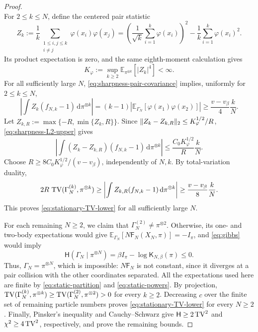 \documentclass[11pt,reqno]{amsart}
\numberwithin{equation}{section}
\theoremstyle{plain}
\theoremstyle{remark}
\DeclarePairedDelimiter{\norm}{\lVert}{\rVert}
\newcommand{\E}{\mathbb E}\newcommand{\Q}{\mathbb Q}\newcommand{\Pb}{\mathbb P}
\newcommand{\K}{\mathsf K}\newcommand{\g}{\mathsf g}\newcommand{\Fr}{\mathsf F}
\newcommand{\Hr}{\mathsf H}\newcommand{\dd}{\,\mathrm d}
\begin{document}
\begin{proof}
\begin{equation}
\end{equation}
For $2\le k\le N$, define the centered pair statistic
\begin{equation}\label{eq:sharpness-pair-statistic}
 Z_k:=\frac1k\sum_{\substack{1\le i,j\le k\\i\ne j}}\varphi(x_i)\varphi(x_j)
 =\left(\frac1{\sqrt k}\sum_{i=1}^k\varphi(x_i)\right)^2-\frac1k\sum_{i=1}^k\varphi(x_i)^2.
\end{equation}
Its product expectation is zero, and the same eighth-moment calculation gives
\begin{equation}\label{eq:sharpness-pair-fourth-moment}
 K_\varphi:=\sup_{k\ge2}\E_{\pi^{\otimes k}}[|Z_k|^4]<\infty.
\end{equation}
For all sufficiently large $N$, \eqref{eq:sharpness-pair-covariance} implies, uniformly for $2\le k\le N$,
\begin{equation}\label{eq:sharpness-pair-response}
 \left|\int Z_k(f_{N,k}-1)\dd\pi^{\otimes k}\right|
 =(k-1)\left|\E_{\Gamma_N}[\varphi(x_1)\varphi(x_2)]\right|
 \ge\frac{v-v_\beta}{4}\frac{k}{N}.
\end{equation}
Let $Z_{k,R}:=\max\{-R,\min\{Z_k,R\}\}$. Since $\norm{Z_k-Z_{k,R}}_2\le K_\varphi^{1/2}/R$, \eqref{eq:sharpness-L2-upper} gives
\begin{equation}\label{eq:sharpness-clipping-error}
 \left|\int(Z_k-Z_{k,R})(f_{N,k}-1)\dd\pi^{\otimes k}\right|
 \le\frac{C_0K_\varphi^{1/2}}{R}\frac{k}{N}.
\end{equation}
Choose $R\ge8C_0K_\varphi^{1/2}/(v-v_\beta)$, independently of $N,k$. By total-variation duality,
\begin{equation}\label{eq:sharpness-TV-duality}
 2R\,\TV(\Gamma_N^{(k)},\pi^{\otimes k})
 \ge\left|\int Z_{k,R}(f_{N,k}-1)\dd\pi^{\otimes k}\right|
 \ge\frac{v-v_\beta}{8}\frac{k}{N}.
\end{equation}
This proves \eqref{eq:stationary-TV-lower} for all sufficiently large $N$.

For each remaining $N\ge2$, we claim that $\Gamma_N^{(2)}\ne\pi^{\otimes2}$. Otherwise, its one- and two-body expectations would give $\E_{\Gamma_N}[N\Fr_N(X_N,\pi)]=-I_\pi$, and \eqref{eq:gibbs} would imply
\begin{equation}\label{eq:sharpness-finite-N-entropy}
 \Hr(\Gamma_N\mid\pi^{\otimes N})=\beta I_\pi-\log\K_{N,\beta}(\pi)\le0.
\end{equation}
Thus, $\Gamma_N=\pi^{\otimes N}$, which is impossible: $N\Fr_N$ is not constant, since it diverges at a pair collision with the other coordinates separated. All the expectations used here are finite by \eqref{eq:static-partition} and \eqref{eq:static-powers}. By projection, $\operatorname{TV}(\Gamma_N^{(k)},\pi^{\otimes k})\ge\operatorname{TV}(\Gamma_N^{(2)},\pi^{\otimes2})>0$ for every $k\ge2$. Decreasing $c$ over the finite set of remaining particle numbers proves \eqref{eq:stationary-TV-lower} for every $N\ge2$. Finally, Pinsker's inequality and Cauchy--Schwarz give $\Hr\ge2\TV^2$ and $\chi^2\ge4\operatorname{TV}^2$, respectively, and prove the remaining bounds.
\end{proof}
\end{document}
